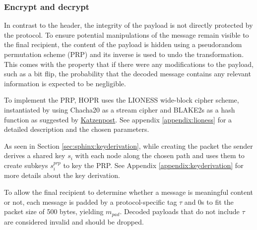 \subsubsection{Encrypt and decrypt}

In contrast to the header, the integrity of the payload is not directly protected by the protocol. To ensure potential manipulations of the message remain visible to the final recipient, the content of the payload is hidden using a pseudorandom permutation scheme (PRP) and its inverse is used to undo the transformation. This comes with the property that if there were any modifications to the payload, such as a bit flip, the probability that the decoded message contains any relevant information is expected to be negligible.

To implement the PRP, HOPR uses the LIONESS \cite{lionesspaper} wide-block cipher scheme, instantiated by using Chacha20 as a stream cipher and BLAKE2s as a hash function as suggested by \href{https://katzenpost.mixnetworks.org/docs/specs/lioness.html}{Katzenpost}. See appendix \ref{appendix:lioness} for a detailed description and the chosen parameters.

As seen in Section \ref{sec:sphinx:keyderivation}, while creating the packet the sender derives a shared key $s_i$ with each node along the chosen path and uses them to create subkeys $s_i^{prp}$ to key the PRP. See Appendix \ref{appendix:keyderivation} for more details about the key derivation.

To allow the final recipient to determine whether a message is meaningful content or not, each message is padded by a protocol-specific tag $\tau$ and 0s to fit the packet size of 500 bytes, yielding $m_{pad}$. Decoded payloads that do not include $\tau$ are considered invalid and should be dropped.

